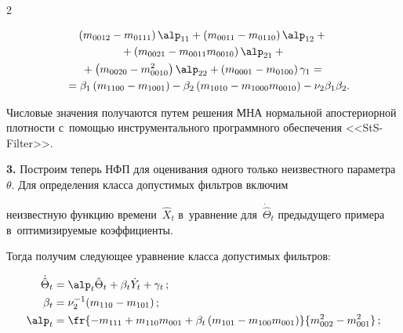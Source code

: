 \begin{multicols}{2}
{    \begin{multline*}

   \left(m_{0012}-m_{0111}\right) \alp_{11} +\left(m_{0011}-m_{0110}\right)\alp_{12} + {}\\

   {}+\left(m_{0021}-m_{0011}m_{0010}\right)\alp_{21}+{}\\

{}+ \left(m_{0020}-m_{0010}^2\right)\alp_{22} +\left(m_{0001}-m_{0100}\right)\gamma_1={}\\

\!{}= \beta_1 \left(m_{1100}-m_{1001}\right)-\beta_2

\left(m_{1010}-m_{1000}m_{0010}\right) -\nu_2 \beta_1\beta_2.\hspace*{-9.5pt}


\end{multline*}

Числовые значения получаются путем решения МНА нормальной апостериорной плот\-ности с~по\-мощью инструментального программного обеспечения <<StS-Filter>>.



\smallskip



\textbf{3.} Построим теперь  НФП для оценивания одного только неизвестного параметра~$\theta$. Для определения класса допустимых фильтров включим

неизвестную функцию времени~$\hat{X}_t$ в~уравнение для~$\dot{\hat

\Theta}_t$ предыдущего примера в~оптимизируемые коэффициенты.

Тогда получим следующее уравнение класса допустимых фильтров:

\begin{align*}

    \dot{\hat \Theta}_t& =\alp _t\hat \Theta_t +\beta_t \dot Y_t +\gamma_t\,;


    \\

    \beta_t&= \nu_2^{-1} (m_{110} -m_{101})\,;


    \\

    \alp_t&=\fr{-m_{111}+m_{110}m_{001}+\beta_t \left(m_{101}-m_{100}m_{001}\right)}{m_{002}^2-m_{001}^2}\,;



\end{align*}}
\end{multicols}
